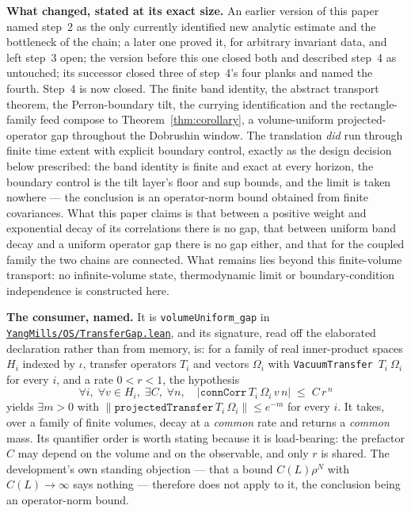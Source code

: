\documentclass[11pt]{article}
\theoremstyle{definition}
\newcommand{\anchor}{c7b870b05bd6d1bec270d499e1358a64070ce0e1}
\newcommand{\repofile}[2]{%
  \href{https://github.com/lluiseriksson/THE-ERIKSSON-PROGRAMME/blob/\anchor/#1}{\nolinkurl{#2}}}
\begin{document}
\textbf{What changed, stated at its exact size.}  An earlier version of this
paper named step~2 as the only currently identified new analytic estimate and
the bottleneck of the chain; a later one proved it, for arbitrary invariant
data, and left step~3 open; the version before this one closed both and
described step~4 as untouched; its successor closed three of step~4's four
planks and named the fourth.  Step~4 is now closed.  The finite band
identity, the abstract transport theorem, the Perron-boundary tilt, the
currying identification and the rectangle-family feed compose to
Theorem~\ref{thm:corollary}, a volume-uniform projected-operator gap
throughout the Dobrushin window.  The translation \emph{did} run through
finite time extent with explicit boundary control, exactly as the design
decision below prescribed: the band identity is finite and exact at every
horizon, the boundary control is the tilt layer's floor and sup bounds, and
the limit is taken nowhere --- the conclusion is an operator-norm bound
obtained from finite covariances.  What this paper claims is that between a
positive weight and exponential decay of its correlations there is no gap,
that between uniform band decay and a uniform operator gap there is no gap
either, and that for the coupled family the two chains are connected.
What remains lies beyond this finite-volume transport: no infinite-volume
state, thermodynamic limit or boundary-condition independence is
constructed here.


\textbf{The consumer, named.}  It is \texttt{volumeUniform\_gap} in
\repofile{YangMills/OS/TransferGap.lean}{YangMills/OS/TransferGap.lean}, and its
signature, read off the elaborated declaration rather than from memory, is: for a
family of real inner-product spaces $H_i$ indexed by $\iota$, transfer operators
$T_i$ and vectors $\Omega_i$ with \texttt{VacuumTransfer}~$T_i~\Omega_i$ for every
$i$, and a rate $0<r<1$, the hypothesis
\[
  \forall i,\;\forall v\in H_i,\;\exists C,\;\forall n,\quad
  \bigl|\texttt{connCorr}\,T_i\,\Omega_i\,v\,n\bigr|\;\le\;C\,r^{\,n}
\]
yields $\exists m>0$ with
$\|\texttt{projectedTransfer}\,T_i\,\Omega_i\|\le e^{-m}$ for every $i$.  It
takes, over a family of finite volumes, decay at a \emph{common} rate and returns
a \emph{common} mass.  Its quantifier order is worth stating because it is
load-bearing: the
prefactor $C$ may depend on the volume and on the observable, and only $r$ is
shared.  The development's own standing objection --- that a bound
$C(L)\rho^{N}$ with $C(L)\to\infty$ says nothing --- therefore does not apply to
it, the conclusion being an operator-norm bound.
\end{document}
